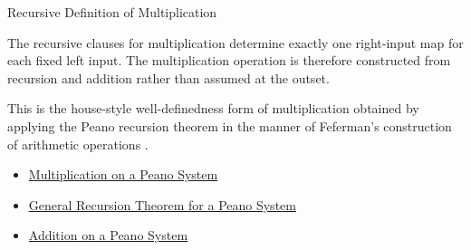 \begin{topicbox}{Recursive Definition of Multiplication}
\begin{remark*}[Interpretation]
The recursive clauses for multiplication determine exactly one right-input map
for each fixed left input. The multiplication operation is therefore
constructed from recursion and addition rather than assumed at the outset.
\end{remark*}

\begin{remark*}
This is the house-style well-definedness form of multiplication obtained by
applying the Peano recursion theorem in the manner of Feferman's construction
of arithmetic operations \citep{FefermanNumberSystems1964}.
\end{remark*}

\begin{dependencies}
\begin{itemize}
  \item \hyperref[def:multiplication-on-peano-system]{Multiplication on a Peano System}
  \item \hyperref[thm:general-recursion-theorem-for-peano-system]{General Recursion Theorem for a Peano System}
  \item \hyperref[def:addition-on-peano-system]{Addition on a Peano System}
\end{itemize}
\end{dependencies}
\end{topicbox}

